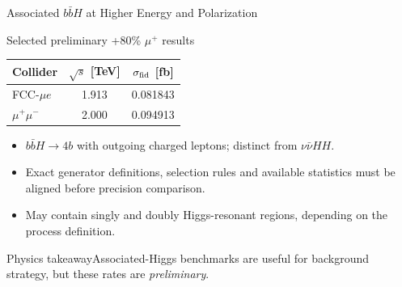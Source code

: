 \documentclass[aspectratio=1610,english]{beamer}
\newcommand{\src}[1]{\vfill{\par\color{black!65}\fontsize{6.4}{7.4}\selectfont\emph{Source:} #1\par}}
\newcommand{\key}[1]{\begin{alertblock}{Physics takeaway}\scriptsize #1\end{alertblock}}
\begin{document}
\begin{frame}[t]{Associated $b\bar bH$ at Higher Energy and Polarization}
\small

\begin{block}{Selected preliminary +80\% $\mu^+$ results}
\begin{center}\begin{tabular}{lcc}\toprule
Collider & $\sqrt{s}$ [TeV] & $\sigma_{\rm fid}$ [fb]\\\midrule
FCC-$\mu e$ & 1.913 & 0.081843\\
$\mu^+\mu^-$ & 2.000 & 0.094913\\\bottomrule
\end{tabular}\end{center}
\end{block}
\begin{itemize}
\item $b\bar bH\to4b$ with outgoing charged leptons; distinct from $\nu\bar\nu HH$.
\item Exact generator definitions, selection rules and available statistics must be aligned before precision comparison.
\item May contain singly and doubly Higgs-resonant regions, depending on the process definition.
\end{itemize}
\key{Associated-Higgs benchmarks are useful for background strategy, but these rates are \emph{preliminary}.}

\end{frame}
\end{document}
